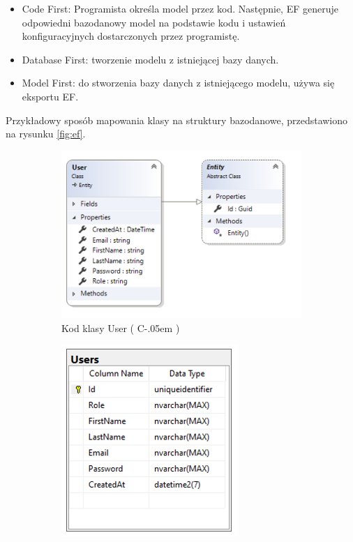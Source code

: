 \documentclass[12pt]{article}
\newcommand{\Csharp}{%
  {\settoheight{\dimen0}{C}C\kern-.05em \resizebox{!}{\dimen0}{\raisebox{\depth}{\# }}}}
\numberwithin{figure}{section}
\begin{document}
    \begin{itemize}
        \item Code First: Programista określa model przez kod. Następnie, EF generuje odpowiedni bazodanowy model na podstawie kodu i ustawień konfiguracyjnych dostarczonych przez programistę.
        \item Database First: tworzenie modelu z istniejącej bazy danych.
        \item Model First: do stworzenia bazy danych z istniejącego modelu, używa się eksportu EF.
    \end{itemize}
    
    Przykładowy sposób mapowania klasy na struktury bazodanowe, przedstawiono na rysunku \ref{fig:ef}.
    
    \begin{figure}[H]
    \centering
    \begin{subfigure}{.6\textwidth}
      \centering
      \includegraphics[width=.9\linewidth]{images/chapter_3/ef-code.png}
      \caption{Kod klasy User (\Csharp)}
      \label{fig:ef-code}
    \end{subfigure}%
    \begin{subfigure}{.4\textwidth}
      \centering
      \includegraphics[width=.9\linewidth]{images/chapter_3/ef-db.png}

\end{subfigure}
\end{figure}
\end{document}
